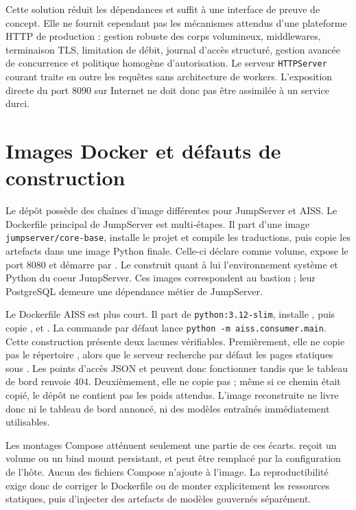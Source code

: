 \documentclass[11pt,a4paper,oneside]{report}
\theoremstyle{definition}
\theoremstyle{plain}
\begin{document}
Cette solution réduit les dépendances et suffit à une interface de preuve de
concept. Elle ne fournit cependant pas les mécanismes attendus d'une
plateforme HTTP de production : gestion robuste des corps volumineux,
middlewares, terminaison TLS, limitation de débit, journal d'accès structuré,
gestion avancée de concurrence et politique homogène d'autorisation. Le
serveur \texttt{HTTPServer} courant traite en outre les requêtes sans
architecture de workers. L'exposition directe du port 8090 sur Internet ne
doit donc pas être assimilée à un service durci.

\section{Images Docker et défauts de construction}

Le dépôt possède des chaînes d'image différentes pour JumpServer et AISS. Le
Dockerfile principal de JumpServer est multi-étapes. Il part d'une image
\texttt{jumpserver/core-base}, installe le projet et compile les traductions,
puis copie les artefacts dans une image Python finale. Celle-ci déclare
 comme volume, expose le port 8080 et démarre par
. Le  construit quant à lui
l'environnement système et Python du coeur JumpServer. Ces images
correspondent au bastion ; leur PostgreSQL demeure une dépendance métier de
JumpServer.

Le Dockerfile AISS est plus court. Il part de
\texttt{python:3.12-slim}, installe , puis copie
,  et . La commande par défaut lance
\texttt{python -m aiss.consumer.main}. Cette construction présente deux
lacunes vérifiables. Premièrement, elle ne copie pas le répertoire
, alors que le serveur recherche par défaut les pages statiques
sous . Les points d'accès JSON et  peuvent donc
fonctionner tandis que le tableau de bord renvoie 404. Deuxièmement, elle ne
copie pas ; même si ce chemin était copié, le dépôt ne
contient pas les poids attendus. L'image reconstruite ne livre donc ni le
tableau de bord annoncé, ni des modèles entraînés immédiatement utilisables.

Les montages Compose atténuent seulement une partie de ces écarts.
 reçoit un volume ou un bind mount persistant, et
 peut être remplacé par la configuration de l'hôte. Aucun
des fichiers Compose n'ajoute  à l'image. La reproductibilité exige
donc de corriger le Dockerfile ou de monter explicitement les ressources
statiques, puis d'injecter des artefacts de modèles gouvernés séparément.
\end{document}
